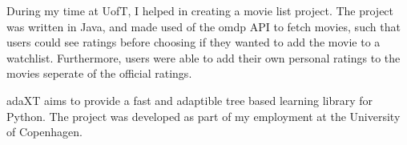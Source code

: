 \resumeSubHeadingListStart

  \small{
    During my time at UofT, I helped in creating a movie list project. The project was written in Java,
    and made used of the omdp API to fetch movies, such that users could see ratings before choosing
    if they wanted to add the movie to a watchlist. Furthermore, users were able to add their own personal
    ratings to the movies seperate of the official ratings.
  }

  \small{
    adaXT aims to provide a fast and adaptible tree based learning library for Python.
    The project was developed as part of my employment at the University of Copenhagen.
  }

\resumeSubHeadingListEnd
